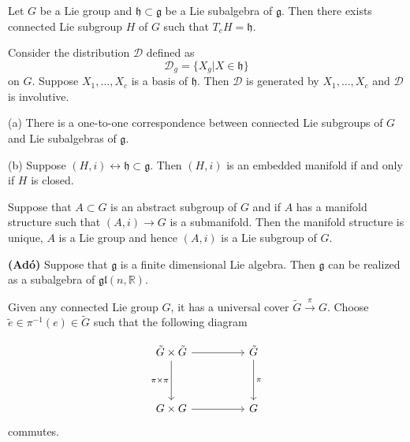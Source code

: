 \documentclass[11pt,a4paper]{scrarticle}
\theoremstyle{definition}
\renewenvironment{proof}[1][\proofname]{\vspace{-15pt}\begin{myproof}}{\end{myproof}}
\theoremstyle{greenbox}
\newcommand{\R}{\mathbb{R}}
\begin{document}
    \begin{thm}
        Let $ G $ be a Lie group and $ \mathfrak{h} \subset \mathfrak{g} $ be a Lie subalgebra of $ \mathfrak{g} $. Then there exists connected Lie subgroup $ H $ of $ G $ such that $ T_{e}H = \mathfrak{h} $.
    \end{thm}
    \begin{proof}
        Consider the distribution $ \mathscr{D} $ defined as 
        \[ \mathscr{D}_{g} = \{X_{g}| X \in \mathfrak{h} \} \]
        on $ G $. Suppose $ X_{1}, \ldots, X_{c} $ is a basis of $ \mathfrak{h} $. Then $ \mathscr{D} $ is generated by $ X_{1}, \ldots,X_{c} $ and $ \mathscr{D}  $ is involutive.
    \end{proof}
    \begin{corollary}
        (a) There is a one-to-one correspondence between connected Lie subgroups of $ G $ and Lie subalgebras of $ \mathfrak{g} $.

        (b) Suppose $ (H,i) \leftrightarrow \mathfrak{h} \subset \mathfrak{g} $. Then $ (H,i) $ is an embedded manifold if and only if $ H $ is closed.
    \end{corollary}

    \begin{thm}
        Suppose that $ A \subset G$ is an abstract subgroup of $ G $ and if $ A  $ has a manifold structure such that $ (A,i) \to G $ is a submanifold. Then the manifold structure is unique, $ A $ is a Lie group and hence $ (A,i) $ is a Lie subgroup of $ G $.
    \end{thm}
    \begin{thm}\textbf{(Ad\'o)} 
        Suppose that $ \mathfrak{g} $ is a finite dimensional Lie algebra. Then $ \mathfrak{g} $ can be realized as a  subalgebra of $ \mathfrak{gl}(n, \R) $.
    \end{thm}
    
    Given any connected Lie group $ G $, it has a universal cover $ \tilde{G} \xrightarrow{\pi} G $. Choose $ \tilde{e} \in \pi^{-1}(e) \in \tilde{G} $ such that the following diagram 

\[\begin{tikzcd}[ampersand replacement=\&]
	{\tilde{G}\times\tilde{G}} \&\& {\tilde{G}} \\
	\\
	{G \times G} \&\& G
	\arrow[from=1-1, to=1-3]
	\arrow[from=3-1, to=3-3]
	\arrow["\pi", from=1-3, to=3-3]
	\arrow["{\pi \times \pi}"', from=1-1, to=3-1]
\end{tikzcd}\] commutes.
\end{document}
